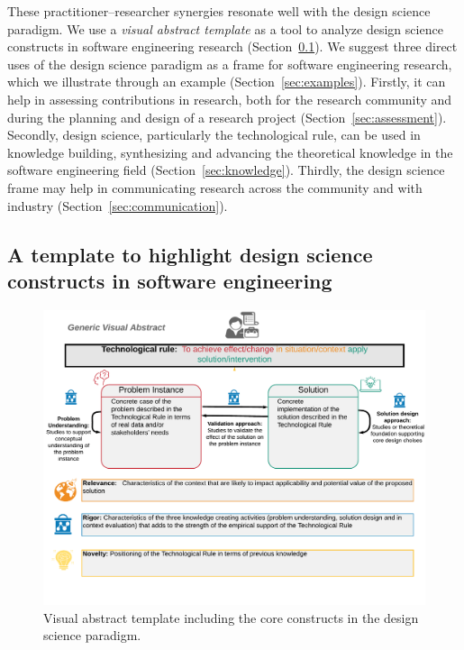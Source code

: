 \documentclass[graybox]{svmult}
\begin{document}
These practitioner--researcher synergies resonate well with the design science paradigm.  We use a \emph{visual abstract template} as a tool to analyze design science constructs in software engineering research (Section~\ref{sec:VA_template}). We suggest three direct uses of the design science paradigm as a frame for software engineering research, which we illustrate through an example (Section~\ref{sec:examples}). Firstly, it can help in assessing contributions in research, both for the research community and during the planning and design of a research project (Section~\ref{sec:assessment}). Secondly, design science, particularly the technological rule, can be used in knowledge building, synthesizing and advancing the theoretical knowledge in the software engineering field (Section~\ref{sec:knowledge}). Thirdly, the design science frame may help in communicating research across the community and with industry (Section~\ref{sec:communication}). 


\subsection{A template to highlight design science constructs in software engineering}
\label{sec:VA_template}


\begin{figure}[t]
  \includegraphics[width=1.0\textwidth]{Figures/GenericVA.png}
\caption{Visual abstract template including the core constructs in the design science paradigm.}
\label{fig:VA-template}       %
\end{figure}
\end{document}
